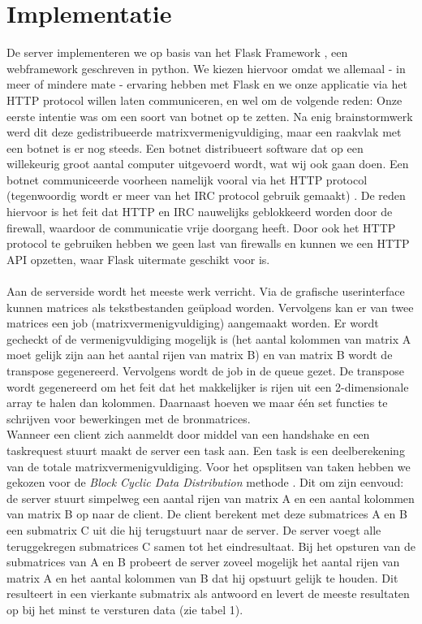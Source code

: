 \documentclass[11pt]{article}
\begin{document}
\section{Implementatie}
De server implementeren we op basis van het Flask Framework \cite{flask}, een webframework
geschreven in python. We kiezen hiervoor omdat we allemaal - in meer of mindere mate -
ervaring hebben met Flask en we onze applicatie via het HTTP protocol willen laten communiceren,
en wel om de volgende reden:
Onze eerste intentie was om een soort van botnet op te zetten. Na enig brainstormwerk werd dit
deze gedistribueerde matrixvermenigvuldiging, maar een raakvlak met een botnet is er nog steeds.
Een botnet distribueert software dat op een willekeurig groot aantal computer uitgevoerd wordt,
wat wij ook gaan doen. Een botnet communiceerde voorheen namelijk vooral via het HTTP protocol
(tegenwoordig wordt er meer van het IRC protocol gebruik gemaakt) \cite{rajab06}. De reden
hiervoor is het feit dat HTTP en IRC nauwelijks geblokkeerd worden door de firewall, waardoor
de communicatie vrije doorgang heeft. Door ook het HTTP protocol te gebruiken hebben we geen
last van firewalls en kunnen we een HTTP API opzetten, waar Flask uitermate geschikt voor is.\\
\\
Aan de serverside wordt het meeste werk verricht. Via de grafische userinterface kunnen
matrices als tekstbestanden ge\"{u}pload worden. Vervolgens kan er van twee matrices een
job (matrixvermenigvuldiging) aangemaakt worden. Er wordt gecheckt of de vermenigvuldiging
mogelijk is (het aantal kolommen van matrix A moet gelijk zijn aan het aantal rijen van matrix
B) en van matrix B wordt de transpose gegenereerd. Vervolgens wordt de job in de queue gezet.
De transpose wordt gegenereerd om het feit dat het makkelijker is rijen uit een 2-dimensionale
array te halen dan kolommen. Daarnaast hoeven we maar \'{e}\'{e}n set functies te schrijven
voor bewerkingen met de bronmatrices.\\
Wanneer een client zich aanmeldt door middel van een handshake en een taskrequest stuurt maakt
de server een task aan. Een task is een deelberekening van de totale matrixvermenigvuldiging.
Voor het opsplitsen van taken hebben we gekozen voor de \emph{Block Cyclic Data Distribution}
methode \cite[2.2]{choi97}. Dit om zijn eenvoud: de server stuurt simpelweg een aantal rijen
van matrix A en een aantal kolommen van matrix B op naar de client. De client berekent met
deze submatrices A en B een submatrix C uit die hij terugstuurt naar de server. De server
voegt alle teruggekregen submatrices C samen tot het eindresultaat. Bij het opsturen van de
submatrices van A en B probeert de server zoveel mogelijk het aantal rijen van matrix A en het
aantal kolommen van B dat hij opstuurt gelijk te houden. Dit resulteert in een vierkante
submatrix als antwoord en levert de meeste resultaten op bij het minst te versturen data (zie
tabel 1).
\end{document}
